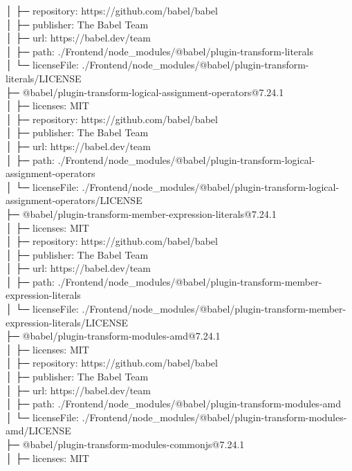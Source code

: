 │  ├─ repository: https://github.com/babel/babel\\
│  ├─ publisher: The Babel Team\\
│  ├─ url: https://babel.dev/team\\
│  ├─ path: ./Frontend/node\_modules/@babel/plugin-transform-literals\\
│  └─ licenseFile: ./Frontend/node\_modules/@babel/plugin-transform-literals/LICENSE\\
├─ @babel/plugin-transform-logical-assignment-operators@7.24.1\\
│  ├─ licenses: MIT\\
│  ├─ repository: https://github.com/babel/babel\\
│  ├─ publisher: The Babel Team\\
│  ├─ url: https://babel.dev/team\\
│  ├─ path: ./Frontend/node\_modules/@babel/plugin-transform-logical-assignment-operators\\
│  └─ licenseFile: ./Frontend/node\_modules/@babel/plugin-transform-logical-assignment-operators/LICENSE\\
├─ @babel/plugin-transform-member-expression-literals@7.24.1\\
│  ├─ licenses: MIT\\
│  ├─ repository: https://github.com/babel/babel\\
│  ├─ publisher: The Babel Team\\
│  ├─ url: https://babel.dev/team\\
│  ├─ path: ./Frontend/node\_modules/@babel/plugin-transform-member-expression-literals\\
│  └─ licenseFile: ./Frontend/node\_modules/@babel/plugin-transform-member-expression-literals/LICENSE\\
├─ @babel/plugin-transform-modules-amd@7.24.1\\
│  ├─ licenses: MIT\\
│  ├─ repository: https://github.com/babel/babel\\
│  ├─ publisher: The Babel Team\\
│  ├─ url: https://babel.dev/team\\
│  ├─ path: ./Frontend/node\_modules/@babel/plugin-transform-modules-amd\\
│  └─ licenseFile: ./Frontend/node\_modules/@babel/plugin-transform-modules-amd/LICENSE\\
├─ @babel/plugin-transform-modules-commonjs@7.24.1\\
│  ├─ licenses: MIT\\
